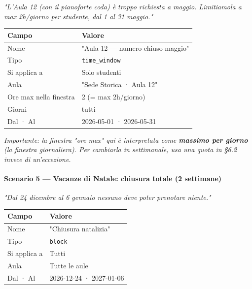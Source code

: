 \documentclass[11pt,a4paper]{article}
\renewenvironment{quote}
  {\begin{list}{}{%
      \setlength{\leftmargin}{8pt}%
      \setlength{\rightmargin}{8pt}%
      \setlength{\topsep}{6pt}%
      \setlength{\parsep}{0pt}}%
      \item\relax\color{black!75}\itshape}
  {\end{list}}
\begin{document}
\begin{quote}
\textit{"L'Aula 12 (con il pianoforte coda) è troppo richiesta a maggio. Limitiamola a max 2h/giorno per studente, dal 1 al 31 maggio."}
\end{quote}

\begin{table}[H]
\centering
\small
\begin{tabularx}{\linewidth}{|X|X|}
\hline
\rowcolor{tableheader} Campo & Valore \\
\hline
Nome & "Aula 12 --- numero chiuso maggio" \\
\hline
Tipo & \texttt{time\_window} \\
\hline
Si applica a & Solo studenti \\
\hline
Aula & "Sede Storica · Aula 12" \\
\hline
Ore max nella finestra & 2 (= max 2h/giorno) \\
\hline
Giorni & tutti \\
\hline
Dal · Al & 2026-05-01 · 2026-05-31 \\
\hline
\end{tabularx}
\end{table}


\begin{quote}
Importante: la finestra "ore max" qui è interpretata come \textbf{massimo per giorno} (la finestra giornaliera). Per cambiarla in settimanale, usa una quota in §6.2 invece di un'eccezione.
\end{quote}

\paragraph{Scenario 5 --- Vacanze di Natale: chiusura totale (2 settimane)}


\begin{quote}
\textit{"Dal 24 dicembre al 6 gennaio nessuno deve poter prenotare niente."}
\end{quote}

\begin{table}[H]
\centering
\small
\begin{tabularx}{\linewidth}{|X|X|}
\hline
\rowcolor{tableheader} Campo & Valore \\
\hline
Nome & "Chiusura natalizia" \\
\hline
Tipo & \texttt{block} \\
\hline
Si applica a & Tutti \\
\hline
Aula & Tutte le aule \\
\hline
Dal · Al & 2026-12-24 · 2027-01-06 \\
\hline
\end{tabularx}
\end{table}
\end{document}
